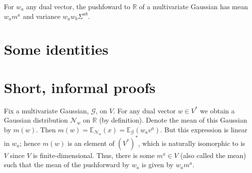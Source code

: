 \documentclass[10pt, a4paper, twocolumn]{article}
\newcommand{\R}{\mathbb{R}}
\newcommand{\E}{\mathbb{E}}
\newcommand{\N}{\mathcal{N}}
\begin{document}
For $w_a$ any dual vector, the pushfoward to $\R$ of a multivariate Gaussian has
mean $w_a m^a$ and variance $w_a w_b \Sigma^{ab}$.

\section{Some identities}




\section{Short, informal proofs}

Fix a multivariate Gaussian, $\mathcal{G}$, on $V$. For any dual vector $w\in V^*$
we obtain a Gaussian distribution $\N_w$ on $\R$ (by definition). Denote the
mean of this Gaussian by $m(w)$. Then $m(w) = \E_{\N_w}(x) = \E_\mathcal{G}(w_a
v^a)$. But this expression is linear in $w_a$; hence $m(w)$ is an
element of $(V^*)^*$, which is naturally isomorphic to is $V$ since $V$ is
finite-dimensional. Thus, there is some $m^a\in V$ (also called the mean) such
that the mean of the pushforward by $w_a$ is given by $w_a m^a$.
\end{document}
